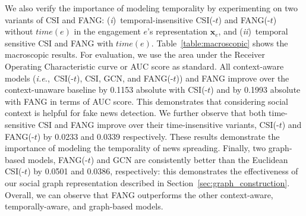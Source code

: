 \documentclass[sigconf]{acmart}
\theoremstyle{definition}
\theoremstyle{hypothesis}
\begin{document}

We also verify the importance of modeling temporality by experimenting on two variants of CSI and FANG: 
(\emph{i})~temporal-insensitive CSI(-$t$) and FANG(-$t$) 
without $time(e)$ in the engagement $e$'s representation $\boldsymbol{x}_{e}$, and (\emph{ii})~temporal sensitive CSI and FANG with $time(e)$. 
Table~\ref{table:macroscopic} shows the macroscopic results. 
For evaluation, we use the area under the Receiver Operating Characteristic curve or AUC score as standard. 
All context-aware models (\textit{i.e.},~CSI(-$t$), CSI, GCN, and FANG(-$t$)) and FANG improve over the context-unaware baseline by 0.1153 absolute
with CSI(-$t$) and by 0.1993 absolute with FANG in terms of AUC score. This demonstrates that considering social context is helpful for fake news detection. %
We further observe that both time-sensitive CSI and FANG improve over their time-insensitive variants, CSI(-$t$) and FANG(-$t$) by 0.0233 and 0.0339 respectively. These results demonstrate the importance of modeling the temporality of news spreading. Finally, two graph-based models, FANG(-$t$) and GCN are consistently better than the Euclidean CSI(-$t$) 
by 0.0501 and 0.0386, respectively: this demonstrates the effectiveness of our social graph representation described in Section~\ref{sec:graph_construction}. Overall, we can observe that FANG outperforms the other context-aware, temporally-aware, and graph-based models.
\end{document}
